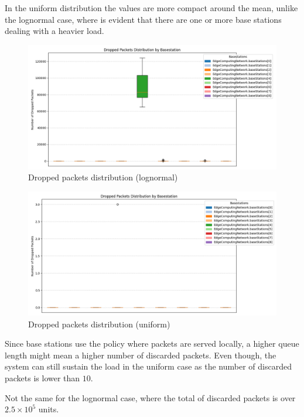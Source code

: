 \documentclass{report}
\begin{document}
In the uniform distribution the values are more compact around the mean, unlike the lognormal case, where is evident that there are one or more base stations dealing with a heavier load.

\begin{figure}[H]
    \centering
    \includegraphics[width=\textwidth]{img/plots/log_1e3_A/dropped.png}
    \caption{Dropped packets distribution (lognormal)}
\end{figure}

\begin{figure}[H]
    \centering
    \includegraphics[width=\textwidth]{img/plots/uni_1e3_A/dropped.png}
    \caption{Dropped packets distribution (uniform)}
\end{figure}

\begin{flushleft}
Since base stations use the policy where packets are served locally, a higher queue length might mean a higher number of discarded packets. Even though, the system can still sustain the load in the uniform case as the number of discarded packets is lower than $10$.

\vspace{1em} 

Not the same for the lognormal case, where the total of discarded packets is over $2.5\times10^5$ units.
\end{flushleft}
\end{document}
